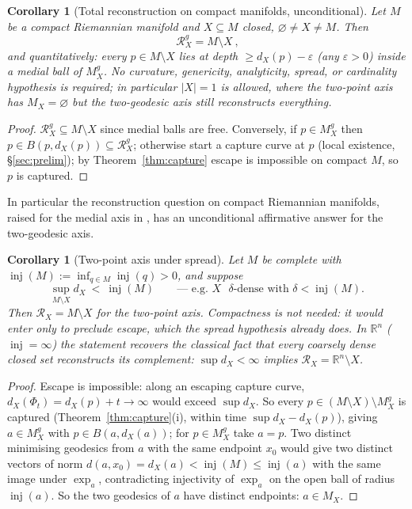 \documentclass[11pt]{article}
\newtheorem{corollary}[theorem]{Corollary}
\theoremstyle{remark}
\newcommand{\R}{\mathbb{R}}
\newcommand{\X}{X}
\newcommand{\Mx}{M_{\X}}
\newcommand{\Mg}{M^{g}_{\X}}
\newcommand{\Rx}{\mathcal{R}_{\X}}
\newcommand{\Rg}{\mathcal{R}^{g}_{\X}}
\newcommand{\dX}{d_{\X}}
\newcommand{\inj}{\operatorname{inj}}
\begin{document}
\begin{corollary}[Total reconstruction on compact manifolds,
unconditional]\label{cor:compact}
Let $M$ be a compact Riemannian manifold and $\X\subseteq M$ closed,
$\varnothing\neq\X\neq M$. Then
\[
  \boxed{\ \Rg=M\setminus\X\ },
\]
and quantitatively: every $p\in M\setminus\X$ lies at depth
$\ge\dX(p)-\varepsilon$ (any $\varepsilon>0$) inside a medial ball of
$\Mg$. No curvature, genericity, analyticity, spread, or cardinality
hypothesis is required; in particular $|\X|=1$ is allowed, where the
two-point axis has $\Mx=\varnothing$ but the two-geodesic axis still
reconstructs everything.
\end{corollary}

\begin{proof}
$\Rg\subseteq M\setminus\X$ since medial balls are free. Conversely,
if $p\in\Mg$ then $p\in B(p,\dX(p))\subseteq\Rg$; otherwise start a
capture curve at $p$ (local existence, \S\ref{sec:prelim}); by
Theorem~\ref{thm:capture} escape is impossible on compact $M$, so $p$
is captured.
\end{proof}

In particular the reconstruction question on compact Riemannian
manifolds, raised for the medial axis in \cite[\S5.2]{Bia}, has an
unconditional affirmative answer for the two-geodesic axis.

\begin{corollary}[Two-point axis under spread]\label{cor:spread}
Let $M$ be complete with $\inj(M):=\inf_{q\in M}\inj(q)>0$, and
suppose
\[
  \sup_{M\setminus\X}\dX\ <\ \inj(M)
  \qquad\text{--- e.g.\ $\X$ $\delta$-dense with $\delta<\inj(M)$.}
\]
Then $\Rx=M\setminus\X$ for the two-point axis. Compactness is not
needed: it would enter only to preclude escape, which the spread
hypothesis already does. In $\R^{n}$ ($\inj=\infty$) the statement
recovers the classical fact that every coarsely dense closed set
reconstructs its complement: $\sup\dX<\infty$ implies
$\Rx=\R^{n}\setminus\X$.
\end{corollary}

\begin{proof}
Escape is impossible: along an escaping capture curve,
$\dX(\Phi_{t})=\dX(p)+t\to\infty$ would exceed $\sup\dX$. So every
$p\in(M\setminus\X)\setminus\Mg$ is captured
(Theorem~\ref{thm:capture}(i), within time $\sup\dX-\dX(p)$), giving
$a\in\Mg$ with $p\in B(a,\dX(a))$; for $p\in\Mg$ take $a=p$. Two
distinct minimising geodesics from $a$ with the same endpoint
$x_{0}$ would give two distinct vectors of norm
$d(a,x_{0})=\dX(a)<\inj(M)\le\inj(a)$ with the same image under
$\exp_{a}$, contradicting injectivity of $\exp_{a}$ on the open ball
of radius $\inj(a)$. So the two
geodesics of $a$ have distinct endpoints: $a\in\Mx$.
\end{proof}
\end{document}

